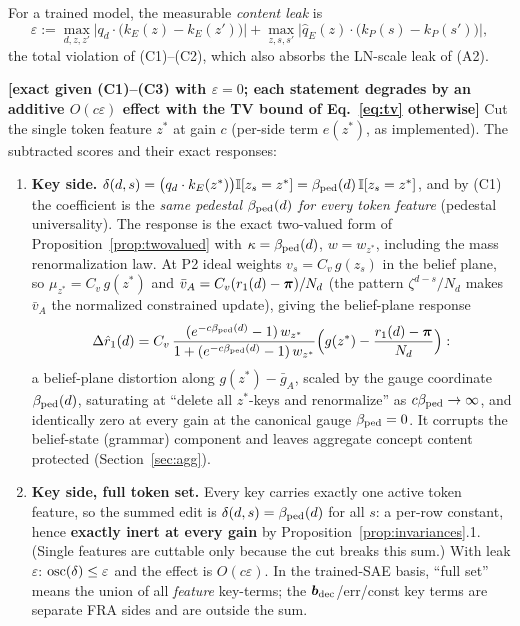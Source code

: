 \documentclass{article}
\begin{document}
\begin{definition}\label{def:leak}
For a trained model, the measurable \emph{content leak} is
\begin{equation}
    \varepsilon := \max_{d, z, z'}\big|q_d\cdot\big(k_E(z) - k_E(z')\big)\big|
    + \max_{z, s, s'}\big|\hat q_E(z)\cdot\big(k_P(s) - k_P(s')\big)\big| ,
\end{equation}
the total violation of (C1)--(C2), which also absorbs the LN-scale leak of (A2).
\end{definition}

\begin{theorem}\label{thm:cutcalc}
\textbf{[exact given (C1)--(C3) with $\varepsilon = 0$; each statement degrades by an additive $O(c\varepsilon)$ effect with the TV bound of Eq.~\eqref{eq:tv} otherwise]} Cut the single token feature $z^*$ at gain $c$ (per-side term $e(z^*)$, as implemented). The subtracted scores and their exact responses:
\begin{enumerate}
    \item \textbf{Key side.} $\delta(d,s) = \big(q_d\cdot k_E(z^*)\big)\mathbb{I}[z_s = z^*] = \beta_{\mathrm{ped}}(d)\,\mathbb{I}[z_s = z^*]$, and by (C1) the coefficient is the \emph{same pedestal $\beta_{\mathrm{ped}}(d)$ for every token feature} (pedestal universality). The response is the exact two-valued form of Proposition~\ref{prop:twovalued} with $\kappa = \beta_{\mathrm{ped}}(d)$, $w = w_{z^*}$, including the mass renormalization law. At P2 ideal weights $v_s = C_v\, g(z_s)$ in the belief plane, so $\mu_{z^*} = C_v\, g(z^*)$ and $\bar v_A = C_v(r_1(d) - \boldsymbol{\pi})/N_d$ (the pattern $\zeta^{d-s}/N_d$ makes $\bar v_A$ the normalized constrained update), giving the belief-plane response
    \begin{equation}\label{eq:beliefcut}
        \Delta\hat r_1(d) = C_v\,\frac{(e^{-c\beta_{\mathrm{ped}}(d)} - 1)\, w_{z^*}}{1 + (e^{-c\beta_{\mathrm{ped}}(d)} - 1)\, w_{z^*}}
        \Big(g(z^*) - \frac{r_1(d) - \boldsymbol{\pi}}{N_d}\Big) :
    \end{equation}
    a belief-plane distortion along $g(z^*) - \bar g_A$, scaled by the gauge coordinate $\beta_{\mathrm{ped}}(d)$, saturating at ``delete all $z^*$-keys and renormalize'' as $c\beta_{\mathrm{ped}} \to \infty$, and identically zero at every gain at the canonical gauge $\beta_{\mathrm{ped}} = 0$. It corrupts the belief-state (grammar) component and leaves aggregate concept content protected (Section~\ref{sec:agg}).
    \item \textbf{Key side, full token set.} Every key carries exactly one active token feature, so the summed edit is $\delta(d,s) = \beta_{\mathrm{ped}}(d)$ for all $s$: a per-row constant, hence \textbf{exactly inert at every gain} by Proposition~\ref{prop:invariances}.1. (Single features are cuttable only because the cut breaks this sum.) With leak $\varepsilon$: $\operatorname{osc}(\delta) \le \varepsilon$ and the effect is $O(c\varepsilon)$. In the trained-SAE basis, ``full set'' means the union of all \emph{feature} key-terms; the $\boldsymbol{b}_{\mathrm{dec}}$/err/const key terms are separate FRA sides and are outside the sum.

\end{enumerate}
\end{theorem}
\end{document}
